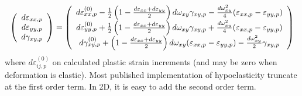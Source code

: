 \documentclass[11pt]{book}
\begin{document}
\begin{equation}
   \left(\begin{array}{c} d\varepsilon_{xx,p} \\ d\varepsilon_{yy,p} \\ d\gamma_{xy,p} \end{array}\right) = 
   \left(\begin{array}{c} d\varepsilon_{xx,p}^{(0)} - {1\over 2}\left(1-{d\varepsilon_{xx}+d\varepsilon_{yy}\over 2}\right)d\omega_{xy}\gamma_{xy,p}
                          - {d\omega_{xy}^2\over 4}(\varepsilon_{xx,p}-\varepsilon_{yy,p}) \\
                d\varepsilon_{yy,p}^{(0)} + {1\over 2}\left(1-{d\varepsilon_{xx}+d\varepsilon_{yy}\over 2}\right)d\omega_{xy}\gamma_{xy,p}
                          + {d\omega_{xy}^2\over 4}(\varepsilon_{xx,p}-\varepsilon_{yy,p}) \\
                d\gamma_{xy,p}^{(0)} + \left(1-{d\varepsilon_{xx}+d\varepsilon_{yy}\over 2}\right)d\omega_{xy}(\varepsilon_{xx,p}-\varepsilon_{yy,p})
                      - {d\omega_{xy}^2\over 2}\gamma_{xy,p} \end{array}\right)
\end{equation}
where $d\varepsilon_{ij,p}^{(0)}$ on calculated plastic strain increments (and may be zero when deformation is elastic). Most published implementation of hypoelasticity truncate at the first order term. In 2D, it is easy to add the second order term.
\end{document}
